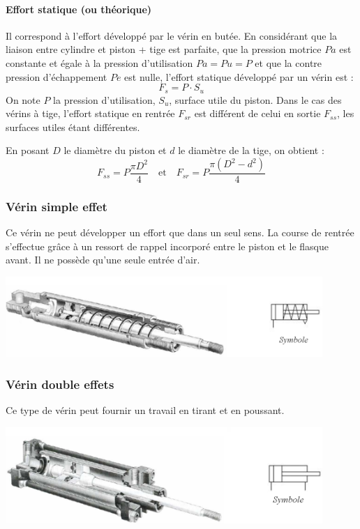 \documentclass[10pt]{article}
\begin{document}
\paragraph{Effort statique (ou théorique)}
Il correspond à l'effort développé par le vérin en butée. En considérant que la liaison entre cylindre et piston + tige est parfaite, que la pression motrice $Pa$ est constante et égale à la pression d'utilisation $Pa=Pu=P$ et que la contre pression d'échappement $Pe$ est nulle, l'effort statique développé par un vérin est :
$$
F_s=P\cdot S_u
$$
On note $P$ la pression d'utilisation, $S_u$, surface utile du piston. Dans le cas des vérins à tige, l'effort statique en rentrée $F_{sr}$ est différent de celui en sortie $F_{ss}$, les surfaces utiles étant différentes. 

En posant $D$ le diamètre du piston et $d$ le diamètre de la tige, on obtient : 
$$
F_{ss}=P\dfrac{\pi D^2}{4} \quad \text{et} \quad F_{sr}=P\dfrac{\pi \left(D^2-d^2\right)}{4}
$$


\subsubsection{Vérin simple effet}

Ce vérin ne peut développer un effort que dans un seul sens.
La course de rentrée s’effectue grâce à un ressort de rappel incorporé entre le piston et le flasque avant. Il ne possède qu’une seule entrée d’air.

\begin{center}
\includegraphics[width=12cm]{images/Fig_04_VerinSE}
\end{center}

\subsubsection{Vérin double effets}
Ce type de vérin peut fournir un travail en tirant et en poussant.

\begin{center}
\includegraphics[width=12cm]{images/Fig_05_VerinDE}
\end{center}
\end{document}
